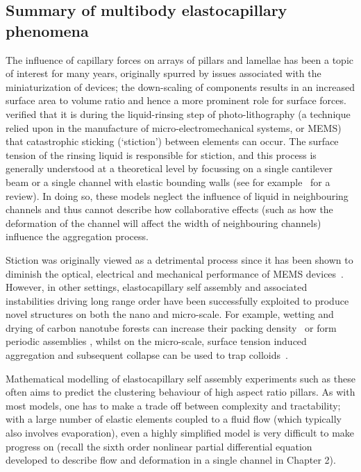 \subsection{Summary of multibody elastocapillary phenomena}
The influence of capillary forces on arrays of pillars and lamellae has been a topic of interest for many years, originally spurred by issues associated with the miniaturization of devices; the down-scaling of components results in an increased surface area to volume ratio and hence a more prominent role for surface forces. \cite{Tanaka1993} verified that it is during the liquid-rinsing step of photo-lithography (a technique relied upon in the manufacture of micro-electromechanical systems, or MEMS) that catastrophic sticking (`stiction') between elements can occur. The surface tension of the rinsing liquid is responsible for stiction, and this process is generally understood at a theoretical level by focussing on a single cantilever beam or a single channel with elastic bounding walls (see for example~\cite{Zhao2003} for a review). In doing so, these models neglect the influence of liquid in neighbouring channels and thus cannot describe how collaborative effects (such as how the deformation of the channel will affect the width of neighbouring channels) influence the aggregation process.

Stiction was originally viewed as a detrimental process since it has been shown to diminish the optical, electrical and mechanical performance of MEMS devices~\citep{DeVolder2013Angewandte}. However, in other settings, elastocapillary self assembly and associated instabilities driving long range order have been successfully exploited to produce novel structures on both the nano and micro-scale. For example, wetting and drying of carbon nanotube forests can increase their packing density~\citep{Chakrapani2004PNAS} or form periodic assemblies \cite[See for example][and references therein]{DeVolder2013Angewandte}, whilst on the micro-scale, surface tension induced aggregation and subsequent collapse can be used to trap colloids~\citep{Pokroy2009Science}.

Mathematical modelling of elastocapillary self assembly experiments such as these often aims to predict the clustering behaviour of high aspect ratio pillars. As with most models, one has to make a trade off between complexity and tractability; with a large number of elastic elements coupled to a fluid flow (which typically also involves evaporation), even a highly simplified model is very difficult to make progress on (recall the sixth order nonlinear partial differential equation
developed to describe flow and deformation in a single channel in Chapter 2).

